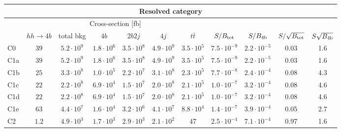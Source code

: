 \begin{tabular}{|l|cc|cccc|cccc|}
  \hline
\multicolumn{11}{|c|}{Resolved category}\\
\hline
&  \multicolumn{6}{c|}{Cross-section [fb]} &  &  & &  \\
   &  $hh\to 4b$ &  total bkg  &   $4b$    &  $2b2j$   &   $4j$    &
$t\bar{t}$ &
$S/B_{\rm tot}$ & $S/B_{\rm 4b}$ & $S/\sqrt{B_{\rm tot}}$ & $S\sqrt{B_{\rm 4b}}$ \\
  \hline
  \hline
 C0    & $39$  &   $5.2\cdot 10^9$   & $1.8\cdot 10^6$ & $3.5\cdot 10^8$ & $4.9\cdot 10^9$ & $3.5\cdot 10^5$  & $7.5\cdot 10^{-9}$   &  $2.2\cdot 10^{-5}$  &   0.03   & 1.6        \\
 C1a   & $39$  &   $5.2\cdot 10^9$   & $1.8\cdot 10^6$ & $3.5\cdot 10^8$ & $4.9\cdot 10^9$ & $3.5\cdot 10^5$ &  $7.5\cdot 10^{-9}$   & $2.2\cdot 10^{-5}$   &     0.03   & 1.6       \\
 C1b   & $25$  &   $3.3\cdot 10^8$   & $1.0\cdot 10^5$ & $2.2\cdot 10^7$ & $3.1\cdot 10^8$ & $2.3\cdot 10^5$ &  $7.7\cdot 10^{-8}$  &  $2.4\cdot 10^{-4}$  &    0.08   & 4.3       \\
 C1c   & $22$  &   $2.2\cdot 10^8$   & $6.9\cdot 10^4$ & $1.5\cdot 10^7$ & $2.0\cdot 10^8$ & $2.1\cdot 10^5$ &  $1.0\cdot 10^{-7}$  &  $3.2\cdot 10^{-4}$  &  0.08   & 4.6         \\
 C1d   & $22$  &   $2.2\cdot 10^8$   & $6.9\cdot 10^4$ & $1.5\cdot 10^7$ & $2.0\cdot 10^8$ & $2.1\cdot 10^5$ &  $1.0\cdot 10^{-7}$  & $3.2\cdot 10^{-4}$   &  0.08   & 4.6         \\
 C1e   & $63$  &   $4.4\cdot 10^7$   & $1.6\cdot 10^4$ & $3.2\cdot 10^6$ & $4.1\cdot 10^7$ & $8.8\cdot 10^4$ &   $1.4\cdot 10^{-7}$  &  $3.9\cdot 10^{-4}$   &   0.05   & 2.7         \\
 C2    & $1.2$  &   $4.9\cdot 10^3$   & $1.7\cdot 10^3$ & $2.9\cdot 10^3$ & $2.1\cdot 10^2$ & $47$ &            $ 2.5\cdot 10^{-4}$   & $7.1\cdot 10^{-4}$   &   0.97   & 1.6       \\
\hline
\end{tabular}
